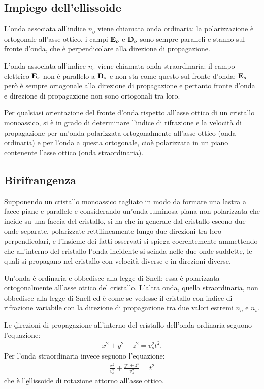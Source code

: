 \subsection{Impiego dell'ellissoide}
L'onda associata all'indice $n_o$ viene chiamata \b{onda ordinaria}: la polarizzazione è ortogonale all'asse ottico, i campi $\mathbf{E}_o$ e $\mathbf{D}_o$ sono sempre paralleli e stanno sul fronte d'onda, che è perpendicolare alla direzione di propagazione.

L'onda associata all'indice $n_s$ viene chiamata \b{onda straordinaria}: il campo elettrico $\mathbf{E}_s$ non è parallelo a $\mathbf{D}_s$ e non sta come questo sul fronte d'onda; $\mathbf{E}_s$ però è sempre ortogonale alla direzione di propagazione e pertanto fronte d'onda e direzione di propagazione non sono ortogonali tra loro.

Per qualsiasi orientazione del fronte d'onda rispetto all'asse ottico di un cristallo monoassico, si è in grado di determinare l'indice di rifrazione e la velocità di propagazione per un'onda polarizzata ortogonalmente all'asse ottico (onda ordinaria) e per l'onda a questa ortogonale, cioè polarizzata in un piano contenente l'asse ottico (onda straordinaria).

\subsection{Birifrangenza}
Supponendo un cristallo monoassico tagliato in modo da formare una lastra a facce piane e parallele e considerando un'onda luminosa piana non polarizzata che incide su una faccia del cristallo, si ha che in generale dal cristallo escono due onde separate, polarizzate rettilineamente lungo due direzioni tra loro perpendicolari, e l'insieme dei fatti osservati si spiega coerentemente ammettendo che all'interno del cristallo l'onda incidente si scinda nelle due onde suddette, le quali si propagano nel cristallo con velocità diverse e in direzioni diverse.

Un'onda è ordinaria e obbedisce alla legge di Snell: essa è polarizzata ortogonalmente all'asse ottico del cristallo. L'altra onda, quella straordinaria, non obbedisce alla legge di Snell ed è come se vedesse il cristallo con indice di rifrazione variabile con la direzione di propagazione tra due valori estremi $n_o$ e $n_s$.

Le \b{direzioni di propagazione} all'interno del cristallo dell'onda ordinaria seguono l'equazione:
\begin{equation}\begin{split}
x^2+y^2+z^2=v_o^2t^2.
\end{split}\end{equation}
Per l'onda straordinaria invece seguono l'equazione:
\begin{equation}\begin{split}
\frac{x^2}{v_o^2}+\frac{y^2+z^2}{v_s^2}=t^2
\end{split}\end{equation}
che è l'\b{ellissoide di rotazione attorno all'asse ottico}.


